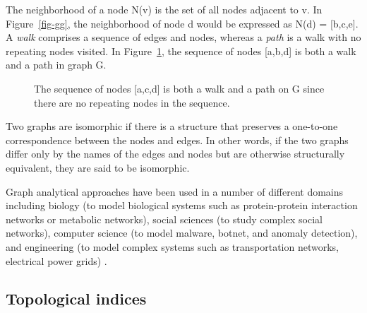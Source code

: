 \documentclass[
  super,
  preprint,
  3p]{elsarticle}
\begin{document}
The neighborhood of a node N(v) is the set of all nodes adjacent to v.
In Figure~\ref{fig-gg}, the neighborhood of node d would be expressed as
N(d) = {[}b,c,e{]}. A \emph{walk} comprises a sequence of edges and
nodes, whereas a \emph{path} is a walk with no repeating nodes visited.
In Figure~\ref{fig-path}, the sequence of nodes {[}a,b,d{]} is both a
walk and a path in graph G.

\begin{figure}


\caption{\label{fig-path}The sequence of nodes {[}a,c,d{]} is both a
walk and a path on G since there are no repeating nodes in the
sequence.}

\end{figure}%

Two graphs are isomorphic if there is a structure that preserves a
one-to-one correspondence between the nodes and edges. In other words,
if the two graphs differ only by the names of the edges and nodes but
are otherwise structurally equivalent, they are said to be isomorphic.

Graph analytical approaches have been used in a number of different
domains including biology (to model biological systems such as
protein-protein interaction networks or metabolic networks), social
sciences (to study complex social networks), computer science (to model
malware, botnet, and anomaly detection), and engineering (to model
complex systems such as transportation networks, electrical power grids)
\citep{RN20}.

\subsection{Topological indices}\label{topological-indices}
\end{document}
